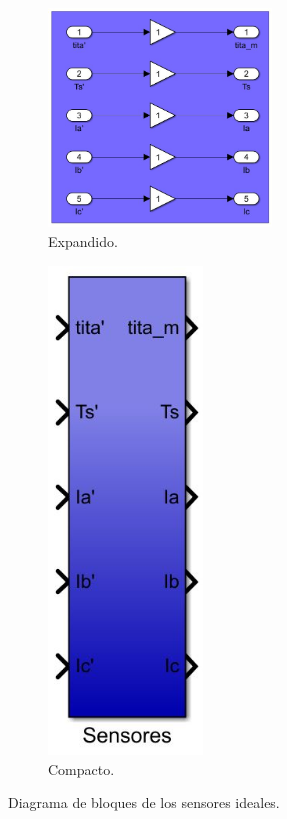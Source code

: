 \documentclass{article}
\begin{document}
\begin{enumerate}[label=\roman*.]
    \begin{figure}[H]
        \begin{subfigure}[b]{0.7\textwidth}
            \centering
            \includegraphics[width=0.65\textwidth]{sensores_ideales.jpg}
            \caption{Expandido.}
        \end{subfigure}
        \begin{subfigure}[b]{0.3\textwidth}
            \centering
            \includegraphics[width=0.45\textwidth]{sensores_ideales_compacto.jpg}
            \caption{Compacto.}
        \end{subfigure}
        \caption{Diagrama de bloques de los sensores ideales.}
    \end{figure}


\end{enumerate}
\end{document}
